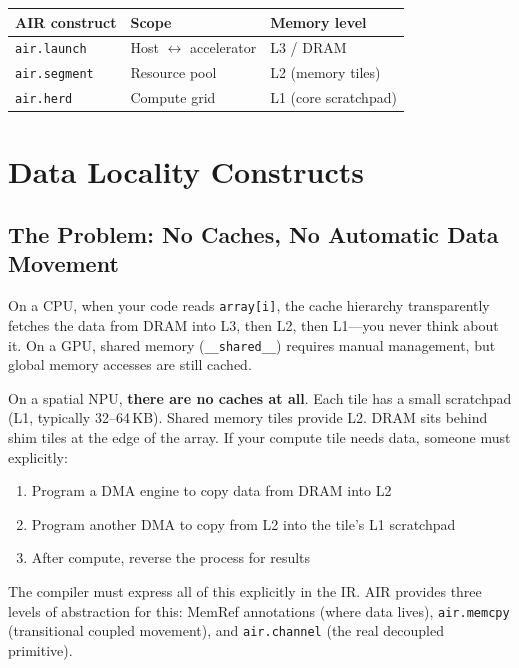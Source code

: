 \documentclass[11pt,a4paper]{article}
\begin{document}
\begin{center}
\begin{tabular}{lll}
\toprule
\textbf{AIR construct} & \textbf{Scope} & \textbf{Memory level} \\
\midrule
\texttt{air.launch} & Host $\leftrightarrow$ accelerator & L3 / DRAM \\
\texttt{air.segment} & Resource pool & L2 (memory tiles) \\
\texttt{air.herd} & Compute grid & L1 (core scratchpad) \\
\bottomrule
\end{tabular}
\end{center}


\section{Data Locality Constructs}

\subsection{The Problem: No Caches, No Automatic Data Movement}

On a CPU, when your code reads \texttt{array[i]}, the cache hierarchy transparently
fetches the data from DRAM into L3, then L2, then L1---you never think about it.
On a GPU, shared memory (\texttt{\_\_shared\_\_}) requires manual management, but
global memory accesses are still cached.

On a spatial NPU, \textbf{there are no caches at all}. Each tile has a small
scratchpad (L1, typically 32--64\,KB). Shared memory tiles provide L2. DRAM sits
behind shim tiles at the edge of the array. If your compute tile needs data, someone
must explicitly:
\begin{enumerate}[leftmargin=2em]
  \item Program a DMA engine to copy data from DRAM into L2
  \item Program another DMA to copy from L2 into the tile's L1 scratchpad
  \item After compute, reverse the process for results
\end{enumerate}

The compiler must express all of this explicitly in the IR. AIR provides three
levels of abstraction for this: MemRef annotations (where data lives),
\texttt{air.memcpy} (transitional coupled movement), and \texttt{air.channel}
(the real decoupled primitive).
\end{document}
